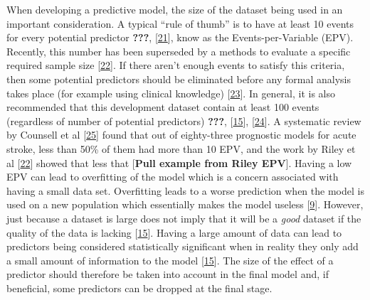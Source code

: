 \documentclass[12pt,PhD,twoside,openright]{muthesis}
\begin{document}
When developing a predictive model, the size of the dataset being used in an important consideration. A typical ``rule of thumb'' is to have at least 10 events for every potential predictor {\textbf{???}}, {[}\protect\hyperlink{ref-peduzzi_simulation_1996}{21}{]}, know as the Events-per-Variable (EPV). Recently, this number has been superseded by a methods to evaluate a specific required sample size {[}\protect\hyperlink{ref-riley_minimum_2019}{22}{]}. If there aren't enough events to satisfy this criteria, then some potential predictors should be eliminated before any formal analysis takes place (for example using clinical knowledge) {[}\protect\hyperlink{ref-sauerbrei_selection_2007}{23}{]}. In general, it is also recommended that this development dataset contain at least 100 events (regardless of number of potential predictors) {\textbf{???}}, {[}\protect\hyperlink{ref-riley_external_2016}{15}{]}, {[}\protect\hyperlink{ref-vergouwe_substantial_2005}{24}{]}. A systematic review by Counsell et al {[}\protect\hyperlink{ref-counsell_systematic_2001}{25}{]} found that out of eighty-three prognostic models for acute stroke, less than 50\% of them had more than 10 EPV, and the work by Riley et al {[}\protect\hyperlink{ref-riley_minimum_2019}{22}{]} showed that less that {[}\textbf{Pull example from Riley EPV}{]}. Having a low EPV can lead to overfitting of the model which is a concern associated with having a small data set. Overfitting leads to a worse prediction when the model is used on a new population which essentially makes the model useless {[}\protect\hyperlink{ref-royston_prognosis_2009}{9}{]}. However, just because a dataset is large does not imply that it will be a \emph{good} dataset if the quality of the data is lacking {[}\protect\hyperlink{ref-riley_external_2016}{15}{]}. Having a large amount of data can lead to predictors being considered statistically significant when in reality they only add a small amount of information to the model {[}\protect\hyperlink{ref-riley_external_2016}{15}{]}. The size of the effect of a predictor should therefore be taken into account in the final model and, if beneficial, some predictors can be dropped at the final stage.
\end{document}
